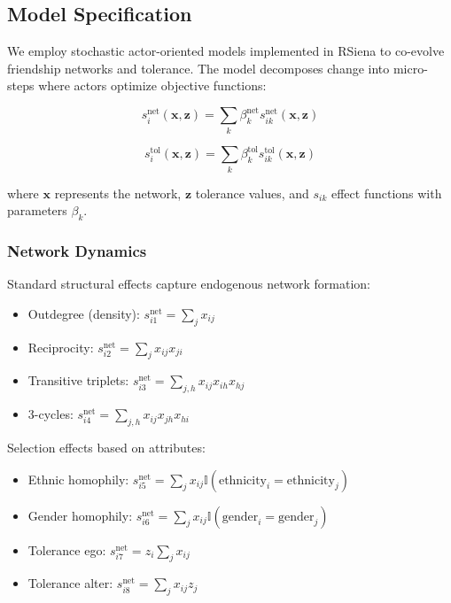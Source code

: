 \documentclass[12pt,a4paper]{article}
\begin{document}
\subsection{Model Specification}

We employ stochastic actor-oriented models implemented in RSiena \citep{snijders2010maximum} to co-evolve friendship networks and tolerance. The model decomposes change into micro-steps where actors optimize objective functions:

\begin{equation}
s_i^{\text{net}}(\mathbf{x}, \mathbf{z}) = \sum_k \beta_k^{\text{net}} s_{ik}^{\text{net}}(\mathbf{x}, \mathbf{z})
\end{equation}

\begin{equation}
s_i^{\text{tol}}(\mathbf{x}, \mathbf{z}) = \sum_k \beta_k^{\text{tol}} s_{ik}^{\text{tol}}(\mathbf{x}, \mathbf{z})
\end{equation}

where $\mathbf{x}$ represents the network, $\mathbf{z}$ tolerance values, and $s_{ik}$ effect functions with parameters $\beta_k$.

\subsubsection{Network Dynamics}

Standard structural effects capture endogenous network formation:
\begin{itemize}
\item Outdegree (density): $s_{i1}^{\text{net}} = \sum_j x_{ij}$
\item Reciprocity: $s_{i2}^{\text{net}} = \sum_j x_{ij}x_{ji}$
\item Transitive triplets: $s_{i3}^{\text{net}} = \sum_{j,h} x_{ij}x_{ih}x_{hj}$
\item 3-cycles: $s_{i4}^{\text{net}} = \sum_{j,h} x_{ij}x_{jh}x_{hi}$
\end{itemize}

Selection effects based on attributes:
\begin{itemize}
\item Ethnic homophily: $s_{i5}^{\text{net}} = \sum_j x_{ij} \mathbb{I}(\text{ethnicity}_i = \text{ethnicity}_j)$
\item Gender homophily: $s_{i6}^{\text{net}} = \sum_j x_{ij} \mathbb{I}(\text{gender}_i = \text{gender}_j)$
\item Tolerance ego: $s_{i7}^{\text{net}} = z_i \sum_j x_{ij}$
\item Tolerance alter: $s_{i8}^{\text{net}} = \sum_j x_{ij} z_j$
\end{itemize}
\end{document}
